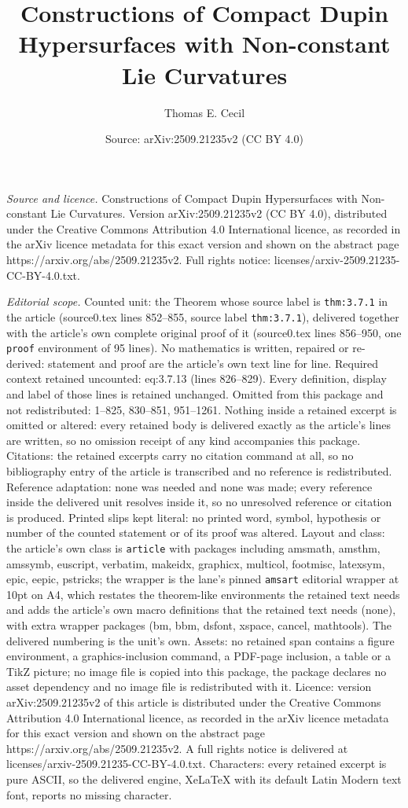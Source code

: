\documentclass[10pt,a4paper]{amsart}
\title[Constructions of Compact Dupin Hypersurfaces with Non-consta]{Constructions of Compact Dupin Hypersurfaces with Non-constant Lie Curvatures}
\author{Thomas E. Cecil}
\date{Source: arXiv:2509.21235v2 (CC BY 4.0)}
\begin{document}
\maketitle

\noindent\emph{Source and licence.} Constructions of Compact Dupin Hypersurfaces with Non-constant Lie Curvatures. Version arXiv:2509.21235v2 (CC BY 4.0), distributed under the Creative Commons Attribution 4.0 International licence, as recorded in the arXiv licence metadata for this exact version and shown on the abstract page https://arxiv.org/abs/2509.21235v2. Full rights notice: licenses/arxiv-2509.21235-CC-BY-4.0.txt.\par\smallskip

\noindent\textit{Editorial scope.} Counted unit: the Theorem whose source label is \texttt{thm:3.7.1} in the article (source0.tex lines 852--855, source label \texttt{thm:3.7.1}), delivered together with the article's own complete original proof of it (source0.tex lines 856--950, one \texttt{proof} environment of 95 lines). No mathematics is written, repaired or re-derived: statement and proof are the article's own text line for line. Required context retained uncounted: eq:3.7.13 (lines 826--829). Every definition, display and label of those lines is retained unchanged. Omitted from this package and not redistributed: 1--825, 830--851, 951--1261. Nothing inside a retained excerpt is omitted or altered: every retained body is delivered exactly as the article's lines are written, so no omission receipt of any kind accompanies this package. Citations: the retained excerpts carry no citation command at all, so no bibliography entry of the article is transcribed and no reference is redistributed. Reference adaptation: none was needed and none was made; every reference inside the delivered unit resolves inside it, so no unresolved reference or citation is produced. Printed slips kept literal: no printed word, symbol, hypothesis or number of the counted statement or of its proof was altered. Layout and class: the article's own class is \texttt{article} with packages including amsmath, amsthm, amssymb, euscript, verbatim, makeidx, graphicx, multicol, footmisc, latexsym, epic, eepic, pstricks; the wrapper is the lane's pinned \texttt{amsart} editorial wrapper at 10pt on A4, which restates the theorem-like environments the retained text needs and adds the article's own macro definitions that the retained text needs (none), with extra wrapper packages (bm, bbm, dsfont, xspace, cancel, mathtools). The delivered numbering is the unit's own. Assets: no retained span contains a figure environment, a graphics-inclusion command, a PDF-page inclusion, a table or a TikZ picture; no image file is copied into this package, the package declares no asset dependency and no image file is redistributed with it. Licence: version arXiv:2509.21235v2 of this article is distributed under the Creative Commons Attribution 4.0 International licence, as recorded in the arXiv licence metadata for this exact version and shown on the abstract page https://arxiv.org/abs/2509.21235v2. A full rights notice is delivered at licenses/arxiv-2509.21235-CC-BY-4.0.txt. Characters: every retained excerpt is pure ASCII, so the delivered engine, XeLaTeX with its default Latin Modern text font, reports no missing character.
\end{document}
